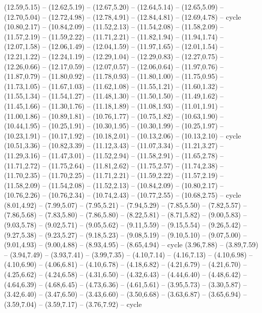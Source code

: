 \expandafter\def\csname geo:gebiet:DC\endcsname{
  }
\expandafter\def\csname geo:gebiet:DE\endcsname{
  (12.59,5.15) -- (12.62,5.19) -- (12.67,5.20) -- (12.64,5.14) -- (12.65,5.09) -- (12.70,5.04) -- (12.72,4.98) -- (12.78,4.91) -- (12.84,4.81) -- (12.69,4.78) -- cycle}
\expandafter\def\csname geo:gebiet:FL\endcsname{
  (10.80,2.17) -- (10.84,2.09) -- (11.52,2.13) -- (11.54,2.08) -- (11.58,2.09) -- (11.57,2.19) -- (11.59,2.22) -- (11.71,2.21) -- (11.82,1.94) -- (11.94,1.74) -- (12.07,1.58) -- (12.06,1.49) -- (12.04,1.59) -- (11.97,1.65) -- (12.01,1.54) -- (12.21,1.22) -- (12.24,1.19) -- (12.29,1.04) -- (12.29,0.83) -- (12.27,0.75) -- (12.26,0.66) -- (12.17,0.59) -- (12.07,0.57) -- (12.06,0.64) -- (11.97,0.76) -- (11.87,0.79) -- (11.80,0.92) -- (11.78,0.93) -- (11.80,1.00) -- (11.75,0.95) -- (11.73,1.05) -- (11.67,1.03) -- (11.62,1.08) -- (11.55,1.21) -- (11.60,1.32) -- (11.55,1.34) -- (11.54,1.27) -- (11.48,1.30) -- (11.50,1.50) -- (11.49,1.62) -- (11.45,1.66) -- (11.30,1.76) -- (11.18,1.89) -- (11.08,1.93) -- (11.01,1.91) -- (11.00,1.86) -- (10.89,1.81) -- (10.76,1.77) -- (10.75,1.82) -- (10.63,1.90) -- (10.44,1.95) -- (10.25,1.91) -- (10.30,1.95) -- (10.30,1.99) -- (10.25,1.97) -- (10.23,1.91) -- (10.17,1.92) -- (10.18,2.01) -- (10.13,2.06) -- (10.13,2.10) -- cycle}
\expandafter\def\csname geo:gebiet:GA\endcsname{
  (10.51,3.36) -- (10.82,3.39) -- (11.12,3.43) -- (11.07,3.34) -- (11.21,3.27) -- (11.29,3.16) -- (11.47,3.01) -- (11.52,2.94) -- (11.58,2.91) -- (11.65,2.78) -- (11.71,2.72) -- (11.75,2.64) -- (11.81,2.62) -- (11.75,2.57) -- (11.74,2.38) -- (11.70,2.35) -- (11.70,2.25) -- (11.71,2.21) -- (11.59,2.22) -- (11.57,2.19) -- (11.58,2.09) -- (11.54,2.08) -- (11.52,2.13) -- (10.84,2.09) -- (10.80,2.17) -- (10.76,2.26) -- (10.76,2.34) -- (10.74,2.43) -- (10.77,2.55) -- (10.68,2.75) -- cycle}
\expandafter\def\csname geo:gebiet:IA\endcsname{
  (8.01,4.92) -- (7.99,5.07) -- (7.95,5.21) -- (7.94,5.29) -- (7.85,5.50) -- (7.82,5.57) -- (7.86,5.68) -- (7.83,5.80) -- (7.86,5.80) -- (8.22,5.81) -- (8.71,5.82) -- (9.00,5.83) -- (9.03,5.78) -- (9.02,5.71) -- (9.05,5.62) -- (9.11,5.59) -- (9.15,5.54) -- (9.26,5.42) -- (9.27,5.38) -- (9.23,5.27) -- (9.18,5.23) -- (9.08,5.19) -- (9.10,5.10) -- (9.07,5.00) -- (9.01,4.93) -- (9.00,4.88) -- (8.93,4.95) -- (8.65,4.94) -- cycle}
\expandafter\def\csname geo:gebiet:ID\endcsname{
  (3.96,7.88) -- (3.89,7.59) -- (3.94,7.49) -- (3.93,7.41) -- (3.99,7.35) -- (4.10,7.14) -- (4.16,7.13) -- (4.10,6.98) -- (4.10,6.90) -- (4.06,6.81) -- (4.10,6.78) -- (4.18,6.82) -- (4.21,6.79) -- (4.21,6.70) -- (4.25,6.62) -- (4.24,6.58) -- (4.31,6.50) -- (4.32,6.43) -- (4.44,6.40) -- (4.48,6.42) -- (4.64,6.39) -- (4.68,6.45) -- (4.73,6.36) -- (4.61,5.61) -- (3.95,5.73) -- (3.30,5.87) -- (3.42,6.40) -- (3.47,6.50) -- (3.43,6.60) -- (3.50,6.68) -- (3.63,6.87) -- (3.65,6.94) -- (3.59,7.04) -- (3.59,7.17) -- (3.76,7.92) -- cycle}
